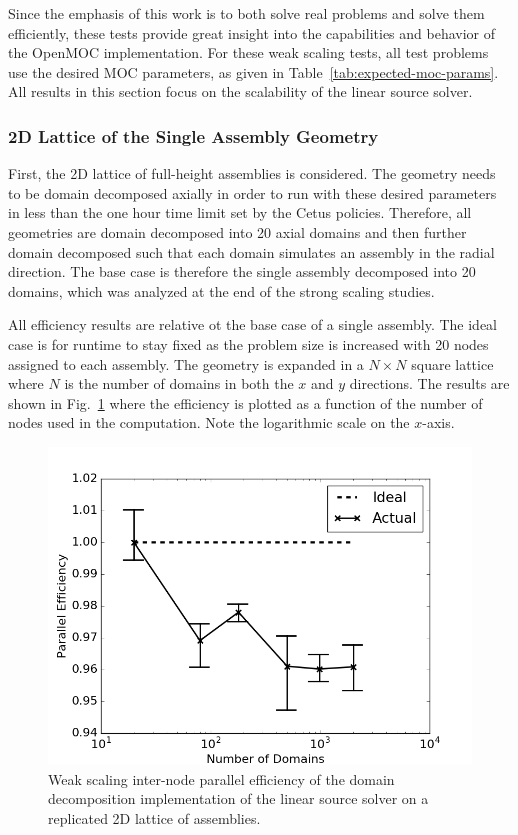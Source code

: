 Since the emphasis of this work is to both solve real problems and solve them efficiently, these tests provide great insight into the capabilities and behavior of the OpenMOC implementation. For these weak scaling tests, all test problems use the desired \ac{MOC} parameters, as given in Table~\ref{tab:expected-moc-params}. All results in this section focus on the scalability of the linear source solver.
 

\subsubsection{2D Lattice of the Single Assembly Geometry}

First, the 2D lattice of full-height assemblies is considered. The geometry needs to be domain decomposed axially in order to run with these desired parameters in less than the one hour time limit set by the Cetus policies. Therefore, all geometries are domain decomposed into 20 axial domains and then further domain decomposed such that each domain simulates an assembly in the radial direction. The base case is therefore the single assembly decomposed into 20 domains, which was analyzed at the end of the strong scaling studies.

All efficiency results are relative ot the base case of a single assembly. The ideal case is for runtime to stay fixed as the problem size is increased with 20 nodes assigned to each assembly. The geometry is expanded in a $N \times N$ square lattice where $N$ is the number of domains in both the $x$ and $y$ directions. The results are shown in Fig.~\ref{fig:dd-ws-2D} where the efficiency is plotted as a function of the number of nodes used in the computation. Note the logarithmic scale on the $x$-axis.

\begin{figure}[h!]
	\centering
	\includegraphics[width=0.6\linewidth]{figures/DD/dd-ws-2D.png}
	\caption[]{Weak scaling inter-node parallel efficiency of the domain decomposition implementation of the linear source solver on a replicated 2D lattice of assemblies.}
	\label{fig:dd-ws-2D}
\end{figure}

